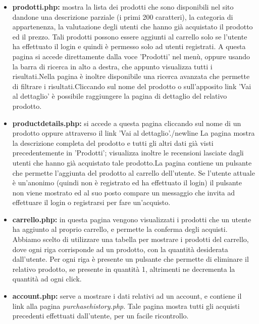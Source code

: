 \begin{itemize}
\item \textbf{prodotti.php:} mostra la lista dei prodotti che sono disponibili nel sito dandone una descrizione parziale (i primi 200 caratteri), la categoria di appartenenza, la valutazione degli utenti che hanno già acquistato il prodotto ed il prezzo. Tali prodotti possono essere aggiunti al carrello solo se l'utente ha effettuato il login e quindi è permesso solo ad utenti registrati. A questa pagina si accede direttamente dalla voce 'Prodotti' nel menù, oppure usando la barra di ricerca in alto a destra, che appunto visualizza tutti i risultati.\newline Nella pagina è inoltre disponibile una ricerca avanzata che permette di filtrare i risultati.\newline Cliccando sul nome del prodotto o sull'apposito link 'Vai al dettaglio' è possibile raggiungere la pagina di dettaglio del relativo prodotto.

\item \textbf{productdetails.php:} si accede a questa pagina cliccando sul nome di un prodotto oppure attraverso il link 'Vai al dettaglio'./newline La pagina mostra la descrizione completa del prodotto e tutti gli altri dati già visti precedentemente in 'Prodotti'; visualizza inoltre le recensioni lasciate dagli utenti che hanno già acquistato tale prodotto.\newline La pagina contiene un pulsante che permette l'aggiunta del prodotto al carrello dell'utente. Se l'utente attuale è un'anonimo (quindi non è registrato ed ha effettuato il login) il pulsante non viene mostrato ed al suo posto compare un messaggio che invita ad effettuare il login o registrarsi per fare un'acquisto. 

\item \textbf{carrello.php:} in questa pagina vengono visualizzati i prodotti che un utente ha aggiunto al proprio carrello, e permette la conferma degli acquisti. Abbiamo scelto di utilizzare una tabella per mostrare i prodotti del carrello, dove ogni riga corrisponde ad un prodotto, con la quantità desiderata dall'utente. Per ogni riga è presente un pulsante che permette di eliminare il relativo prodotto, se presente in quantità 1, altrimenti ne decrementa la quantità ad ogni click.

\item \textbf{account.php:} serve a mostrare i dati relativi ad un account, e contiene il link alla pagina \textit{purchasehistory.php}.
Tale pagina mostra tutti gli acquisti precedenti effettuati dall'utente, per un facile ricontrollo.


\end{itemize}
